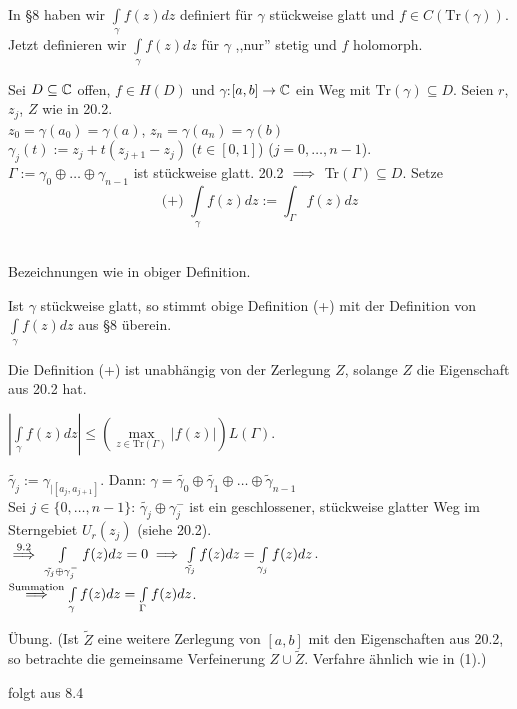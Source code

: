 \documentclass[a4paper,twoside,DIV15,BCOR12mm]{scrbook}
\def\Tr{\text{Tr}}
\def\abnC{\ensuremath{[a,b]\to\MdC}}
\def\wegint{\ensuremath{\int\limits_\gamma}}
\def\iint{\ensuremath{\int\limits}}
\begin{document}
In  \S8 haben wir $\wegint f(z)dz$ definiert f\"ur $\gamma$ st\"uckweise glatt und $f \in C(\Tr(\gamma))$. Jetzt definieren wir $\wegint f(z)dz$ f\"ur $\gamma$ ,,nur'' stetig und $f$ holomorph.
\begin{definition}
  Sei $D\subseteq\mathbb{C}$ offen, $f\in H(D)$ und $\gamma$:$\abnC$ ein Weg mit $\Tr(\gamma) \subseteq D$. Seien $r$, $z_j$, $Z$ wie in 20.2. \\
  $z_0 = \gamma(a_0)=\gamma(a)$, $z_n = \gamma(a_n)=\gamma(b)$\\
  $\gamma_j(t):=z_j+t(z_{j+1}-z_j)$ ($t\in [0,1]$) ($j=0,\dots,n-1$).\\ $\Gamma:=\gamma_0\oplus\dots\oplus\gamma_{n-1}$ ist st\"uckweise glatt. 20.2 $\implies$ Tr$(\Gamma) \subseteq D$. Setze\\
  $$\text{(+) } \wegint f(z)dz:=\iint_\Gamma f(z)dz$$\\
\end{definition}
\begin{lemma}
  Bezeichnungen wie in obiger Definition.
  \begin{liste}
    \item Ist $\gamma$ st\"uckweise glatt, so stimmt obige Definition (+) mit der Definition von $\wegint f(z)dz$ aus \S8 \"uberein.
    \item Die Definition (+) ist unabh\"angig von der Zerlegung $Z$, solange $Z$ die Eigenschaft aus 20.2 hat.
    \item $|\wegint f(z)dz|\le (\max\limits_{z\in\Tr(\Gamma)} |f(z)|) L(\Gamma)$.
  \end{liste}
\end{lemma}
\begin{beweis}
  \begin{liste}
  \item $\tilde{\gamma_j}:=\gamma_{|[a_j,a_{j+1}]}$. Dann: $\gamma=\tilde{\gamma_0}\oplus\tilde{\gamma_1}\oplus\dots\oplus\tilde{\gamma}_{n-1}$\\
    Sei $j\in \{0,\dots,n-1\}$: $\tilde{\gamma_j}\oplus\gamma_j^-$ ist ein geschlossener, st\"uckweise glatter Weg im Sterngebiet $U_r(z_j)$ (siehe 20.2).\\
    $\stackrel{\text{9.2}}{\implies}$ $\iint_{\tilde{\gamma_j}\oplus\gamma_j^-} f(z)dz = 0 \folgt \iint_{\tilde{\gamma_j}} f(z)dz = \iint_{\gamma_j}f(z)dz$.\\
    $\stackrel{\text{Summation}}{\folgt} \wegint f(z)dz = \iint_\Gamma f(z)dz$. 
  \item \"Ubung. (Ist $\tilde{Z}$ eine weitere Zerlegung von $[a,b]$ mit den Eigenschaften aus 20.2, so betrachte die gemeinsame Verfeinerung $Z\cup\tilde{Z}$. Verfahre \"ahnlich wie in (1).)
  \item folgt aus 8.4
  \end{liste}  
\end{beweis}
\end{document}
